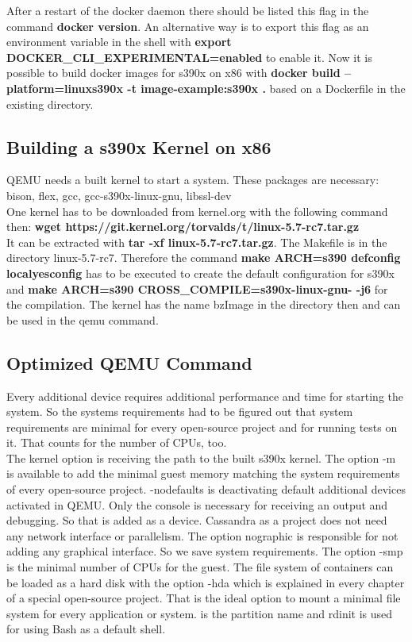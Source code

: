 After a restart of the docker daemon there should be listed this flag in the command \textbf{docker version}. An alternative way is to export this flag as an environment variable in the shell with \textbf{export DOCKER\_CLI\_EXPERIMENTAL=enabled} to enable it. Now it is possible to build docker images for s390x on x86 with \textbf{docker build --platform=linux\/s390x -t image-example:s390x .} based on a Dockerfile in the existing directory.

 

 

\subsection{Building a s390x Kernel on x86}

QEMU needs a built kernel to start a system. These packages are necessary: \\
bison, flex, gcc, gcc-s390x-linux-gnu, libssl-dev \\
One kernel has to be downloaded from kernel.org with the following command then: \textbf{wget https://git.kernel.org/torvalds/t/linux-5.7-rc7.tar.gz}\\
It can be extracted with \textbf{tar -xf  linux-5.7-rc7.tar.gz}. The Makefile is in the directory linux-5.7-rc7. Therefore the command \textbf{make ARCH=s390 defconfig localyesconfig} has to be executed to create the default configuration for s390x and \textbf{make ARCH=s390 CROSS_COMPILE=s390x-linux-gnu- -j6} for the compilation. The kernel has the name bzImage in the directory  then and can be used in the qemu command.

\subsection{Optimized QEMU Command}

Every additional device requires additional performance and time for starting the system. So the systems requirements had to be figured out that system requirements are minimal for every open-source project and for running tests on it. That counts for the number of CPUs, too. \\

The kernel option is receiving the path to the built s390x kernel. The option -m is available to add the minimal guest memory matching the system requirements of every open-source project. -nodefaults is deactivating default additional devices activated in QEMU. Only the console is necessary for receiving an output and debugging. So that is added as a device. Cassandra as a project does not need any network interface or parallelism. The option nographic is responsible for not adding any graphical interface. So we save system requirements. The option -smp is the minimal number of CPUs for the guest. The file system of containers can be loaded as a hard disk with the option -hda which is explained in every chapter of a special open-source project. That is the ideal option to mount a minimal file system for every application or system.  is the partition name and rdinit is used for using Bash as a default shell. \\



